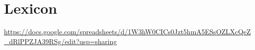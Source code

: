 \section{Lexicon}
\url{https://docs.google.com/spreadsheets/d/1W3hW0CICs0Jzt5hmA5ESsOZLXcQeZ_dRlPPZJA39RSg/edit?usp=sharing}

\begin{multicols}{2}
\begin{hangparas}{1em}{1}



\end{hangparas}
\end{multicols}